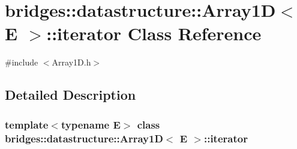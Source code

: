 \hypertarget{classbridges_1_1datastructure_1_1_array1_d_1_1iterator}{}\section{bridges\+::datastructure\+::Array1D$<$ E $>$\+::iterator Class Reference}
\label{classbridges_1_1datastructure_1_1_array1_d_1_1iterator}


{\ttfamily \#include $<$Array1\+D.\+h$>$}



\subsection{Detailed Description}
\subsubsection*{template$<$typename E$>$\newline
class bridges\+::datastructure\+::\+Array1\+D$<$ E $>$\+::iterator}

